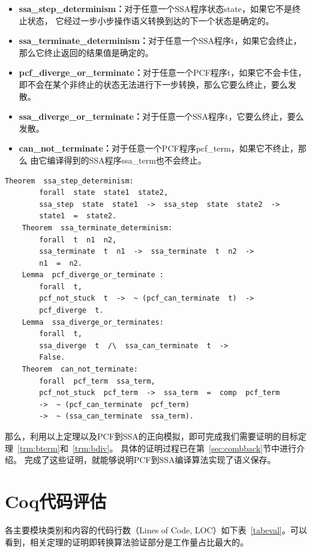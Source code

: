 \begin{itemize}
    \item \textbf{ssa\_step\_determinism：}对于任意一个SSA程序状态state，如果它不是终止状态，
        它经过一步小步操作语义转换到达的下一个状态是确定的。
    \item \textbf{ssa\_terminate\_determinism：}对于任意一个SSA程序t，如果它会终止，
        那么它终止返回的结果值是确定的。
    \item \textbf{pcf\_diverge\_or\_terminate：}对于任意一个PCF程序t，如果它不会卡住，
        即不会在某个非终止的状态无法进行下一步转换，那么它要么终止，要么发散。
    \item \textbf{ssa\_diverge\_or\_terminate：}对于任意一个SSA程序t，它要么终止，要么发散。
    \item \textbf{can\_not\_terminate：}对于任意一个PCF程序pcf\_term，如果它不终止，那么
        由它编译得到的SSA程序ssa\_term也不会终止。
\end{itemize}

\begin{lstlisting}[language=Coq]  
    Theorem  ssa_step_determinism:
        forall  state  state1  state2,
        ssa_step  state  state1  ->  ssa_step  state  state2  ->
        state1  =  state2.
    Theorem  ssa_terminate_determinism:
        forall  t  n1  n2,
        ssa_terminate  t  n1  ->  ssa_terminate  t  n2  ->
        n1  =  n2.
    Lemma  pcf_diverge_or_terminate :
        forall  t,
        pcf_not_stuck  t  ->  ~ (pcf_can_terminate  t)  -> 
        pcf_diverge  t.
    Lemma  ssa_diverge_or_terminates:
        forall  t,
        ssa_diverge  t  /\  ssa_can_terminate  t  ->
        False.
    Theorem  can_not_terminate:
        forall  pcf_term  ssa_term,
        pcf_not_stuck  pcf_term  ->  ssa_term  =  comp  pcf_term 
        ->  ~ (pcf_can_terminate  pcf_term)  
        ->  ~ (ssa_can_terminate  ssa_term).
\end{lstlisting}

那么，利用以上定理以及PCF到SSA的正向模拟，即可完成我们需要证明的目标定理~\ref{trm:bterm}和~\ref{trm:bdiv}。
具体的证明过程已在第~\ref{sec:combback}节中进行介绍。
完成了这些证明，就能够说明PCF到SSA编译算法实现了语义保存。

\section{Coq代码评估}

各主要模块类别和内容的代码行数（Lines of Code, LOC）如下表~\ref{tabeval}。可以看到，相关定理的证明即转换算法验证部分是工作量占比最大的。

